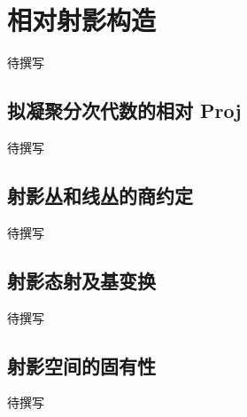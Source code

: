 
% 
% 

\section{相对射影构造}
\label{g5:sec:1402}

待撰写

\subsection{拟凝聚分次代数的相对 Proj}
\label{g5:subsec:1402:01}
待撰写

\subsection{射影丛和线丛的商约定}
\label{g5:subsec:1402:02}
待撰写

\subsection{射影态射及基变换}
\label{g5:subsec:1402:03}
待撰写

\subsection{射影空间的固有性}
\label{g5:subsec:1402:04}
待撰写
